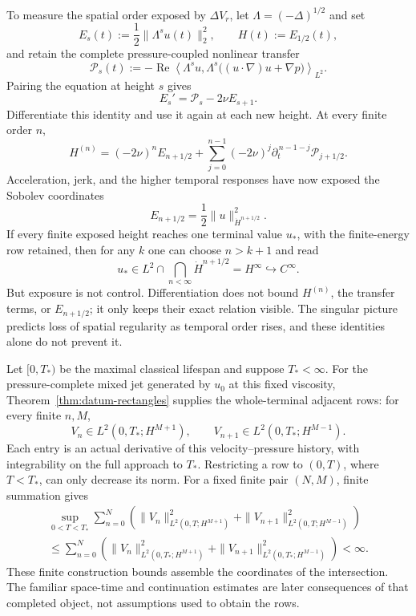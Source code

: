 To measure the spatial order exposed by \(\Delta V_r\), let
\(\Lambda=(-\Delta)^{1/2}\) and set
\[
 E_s(t):=\frac12\|\Lambda^su(t)\|_2^2,
 \qquad
 H(t):=E_{1/2}(t),
\]
and retain the complete pressure-coupled nonlinear transfer
\[
 \mathcal P_s(t)
 :=-\operatorname{Re}\left\langle
 \Lambda^su,
 \Lambda^s\bigl((u\!\cdot\nabla)u+\nabla p\bigr)
 \right\rangle_{L^2}.
\]
Pairing the equation at height \(s\) gives
\[
 E_s'=\mathcal P_s-2\nu E_{s+1}.
\]
Differentiate this identity and use it again at each new height.  At every
finite order \(n\),
\[
 H^{(n)}
 =(-2\nu)^nE_{n+1/2}
 +\sum_{j=0}^{n-1}(-2\nu)^j
   \partial_t^{\,n-1-j}\mathcal P_{j+1/2}.
\]
Acceleration, jerk, and the higher temporal responses have now exposed the
Sobolev coordinates
\[
 E_{n+1/2}
 =\frac12\|u\|_{\dot H^{n+1/2}}^2.
\]
If every finite exposed height reaches one terminal value \(u_*\), with the
finite-energy row retained, then for any \(k\) one can choose \(n>k+1\) and
read
\[
 u_*\in L^2\cap\bigcap_{n<\infty}\dot H^{n+1/2}
 =H^\infty
 \hookrightarrow C^\infty.
\]
But exposure is not control.  Differentiation does not bound
\(H^{(n)}\), the transfer terms, or \(E_{n+1/2}\); it only keeps their exact
relation visible.  The singular picture predicts loss of spatial regularity
as temporal order rises, and these identities alone do not prevent it.

Let \([0,T_*)\) be the maximal classical lifespan and suppose
\(T_*<\infty\).  For the pressure-complete mixed jet generated by \(u_0\)
at this fixed viscosity, Theorem~\ref{thm:datum-rectangles} supplies the
whole-terminal adjacent rows: for every finite \(n,M\),
\[
 V_n\in L^2(0,T_*;H^{M+1}),
 \qquad
 V_{n+1}\in L^2(0,T_*;H^{M-1}).
\]
Each entry is an actual derivative of this velocity--pressure history, with
integrability on the full approach to \(T_*\).  Restricting a row to
\((0,T)\), where \(T<T_*\), can only decrease its norm.  For a fixed finite
pair \((N,M)\), finite summation gives
\[
\begin{gathered}
 \sup_{0<T<T_*}\sum_{n=0}^{N}\left(
  \|V_n\|_{L^2(0,T;H^{M+1})}^2
  +\|V_{n+1}\|_{L^2(0,T;H^{M-1})}^2
 \right)
 \\
 \le\sum_{n=0}^{N}\left(
  \|V_n\|_{L^2(0,T_*;H^{M+1})}^2
  +\|V_{n+1}\|_{L^2(0,T_*;H^{M-1})}^2
 \right)<\infty.
\end{gathered}
\]
These finite construction bounds assemble the coordinates of the intersection.
The familiar space-time and continuation estimates are later consequences of
that completed object, not assumptions used to obtain the rows.

